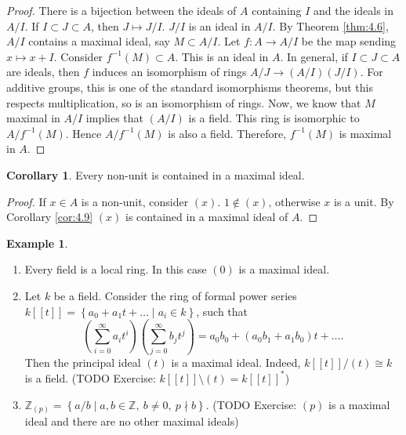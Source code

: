 \documentclass{article}
\newcommand{\Z}{\mathbb{Z}}
\newcommand{\rb}[1]{\left( #1 \right)}
\renewcommand{\sb}[1]{\left[ #1 \right]}
\newcommand{\cb}[1]{\left\{ #1 \right\}}
\theoremstyle{definition}\newtheorem{definition}{Definition}[section]
\theoremstyle{definition}\newtheorem{remark}[definition]{Remark}
\theoremstyle{definition}\newtheorem*{example}{Example}
\theoremstyle{definition}\newtheorem*{note}{Note}
\newtheorem{corollary}[definition]{Corollary}
\begin{document}
\begin{proof}
There is a bijection between the ideals of $ A $ containing $ I $ and the ideals in $ A / I $. If $ I \subset J \subset A $, then $ J \mapsto J / I $. $ J / I $ is an ideal in $ A / I $. By Theorem \ref{thm:4.6}, $ A / I $ contains a maximal ideal, say $ M \subset A / I $. Let $ f : A \to A / I $ be the map sending $ x \mapsto x + I $. Consider $ f^{-1}\rb{M} \subset A $. This is an ideal in $ A $. In general, if $ I \subset J \subset A $ are ideals, then $ f $ induces an isomorphism of rings $ A / J \to \rb{A / I}\rb{J / I} $. For additive groups, this is one of the standard isomorphisms theorems, but this respects multiplication, so is an isomorphism of rings. Now, we know that $ M $ maximal in $ A / I $ implies that $ \rb{A / I} $ is a field. This ring is isomorphic to $ A / f^{-1}\rb{M} $. Hence $ A / f^{-1}\rb{M} $ is also a field. Therefore, $ f^{-1}\rb{M} $ is maximal in $ A $.
\end{proof}

\begin{corollary}
\label{cor:4.10}
Every non-unit is contained in a maximal ideal.
\end{corollary}

\begin{proof}
If $ x \in A $ is a non-unit, consider $ \rb{x} $. $ 1 \notin \rb{x} $, otherwise $ x $ is a unit. By Corollary \ref{cor:4.9} $ \rb{x} $ is contained in a maximal ideal of $ A $.
\end{proof}

\begin{example}
\hfill
\begin{enumerate}
\item Every field is a local ring. In this case $ \rb{0} $ is a maximal ideal.
\item Let $ k $ be a field. Consider the ring of formal power series $ k\sb{\sb{t}} = \cb{a_0 + a_1t + \dots \mid a_i \in k} $, such that
$$ \rb{\sum_{i = 0}^\infty a_it^i}\rb{\sum_{j = 0}^\infty b_jt^j} = a_0b_0 + \rb{a_0b_1 + a_1b_0}t + \dots. $$
Then the principal ideal $ \rb{t} $ is a maximal ideal. Indeed, $ k\sb{\sb{t}} / \rb{t} \cong k $ is a field. (TODO Exercise: $ k\sb{\sb{t}} \setminus \rb{t} = k\sb{\sb{t}}^* $)
\item $ \Z_{\rb{p}} = \cb{a / b \mid a, b \in \Z, \ b \ne 0, \ p \nmid b} $. (TODO Exercise: $ \rb{p} $ is a maximal ideal and there are no other maximal ideals)
\end{enumerate}
\end{example}
\end{document}
